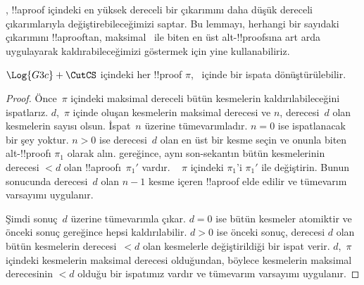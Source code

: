 \documentclass[../../../include/open-logic-section]{subfiles}
\begin{document}
, !!a{proof} içindeki en yüksek dereceli bir
\CutCS{} çıkarımını daha düşük dereceli \CutCS{} çıkarımlarıyla
değiştirebileceğimizi saptar. Bu lemmayı, herhangi bir sayıdaki \CutCS{}
çıkarımını !!a{proof}{}tan, maksimal~\CutCS{} ile biten en üst
alt-!!{proof}s{}ına art arda uygulayarak kaldırabileceğimizi göstermek için
yine kullanabiliriz.

\begin{thm}
$\Log{G3c} + \CutCS$ içindeki her !!{proof} $\pi$,~ içinde bir
ispata dönüştürülebilir.
\end{thm}

\begin{proof}
  Önce~$\pi$ içindeki maksimal dereceli bütün kesmelerin
  kaldırılabileceğini ispatlarız. $d$,~$\pi$ içinde oluşan kesmelerin
  maksimal derecesi ve $n$, derecesi~$d$ olan kesmelerin sayısı olsun.
  İspat~$n$ üzerine tümevarımladır. $n=0$ ise ispatlanacak bir şey yoktur.
  $n>0$ ise derecesi~$d$ olan en üst bir kesme seçin ve onunla biten
  alt-!!{proof}{}ı $\pi_1$ olarak alın.  gereğince,
  aynı son-sekantın bütün kesmelerinin derecesi $<d$ olan
  !!a{proof}{}ı~$\pi_1'$ vardır. ~ $\pi$ içindeki $\pi_1$'i $\pi_1'$ ile
  değiştirin. Bunun sonucunda derecesi~$d$ olan $n-1$ kesme içeren
  !!a{proof} elde edilir ve tümevarım varsayımı uygulanır.

  Şimdi sonuç~$d$ üzerine tümevarımla çıkar. $d=0$ ise bütün kesmeler
  atomiktir ve önceki sonuç gereğince hepsi kaldırılabilir. $d>0$ ise
  önceki sonuç, derecesi $d$ olan bütün kesmelerin derecesi~$<d$ olan
  kesmelerle değiştirildiği bir ispat verir. $d$,~$\pi$ içindeki kesmelerin
  maksimal derecesi olduğundan, böylece kesmelerin maksimal derecesinin
  $<d$ olduğu bir ispatımız vardır ve tümevarım varsayımı uygulanır.
\end{proof}
\end{document}
